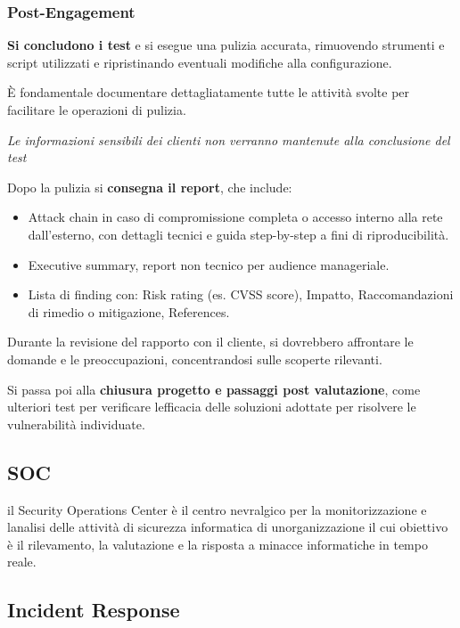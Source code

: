 \subsubsection{Post-Engagement}\label{post-engagement}

\textbf{Si concludono i test} e si esegue una pulizia accurata,
rimuovendo strumenti e script utilizzati e ripristinando eventuali
modifiche alla configurazione.

È fondamentale documentare dettagliatamente tutte le attività svolte per
facilitare le operazioni di pulizia.

\emph{Le informazioni sensibili dei clienti non verranno mantenute alla
conclusione del test}

Dopo la pulizia si \textbf{consegna il report}, che include:

\begin{itemize}
\item
  Attack chain in caso di compromissione completa o accesso interno alla
  rete dall'esterno, con dettagli tecnici e guida step-by-step a fini di
  riproducibilità.
\item
  Executive summary, report non tecnico per audience manageriale.
\item
  Lista di finding con: Risk rating (es. CVSS score), Impatto,
  Raccomandazioni di rimedio o mitigazione, References.
\end{itemize}

Durante la revisione del rapporto con il cliente, si dovrebbero
affrontare le domande e le preoccupazioni, concentrandosi sulle scoperte
rilevanti.

Si passa poi alla \textbf{chiusura progetto e passaggi post
valutazione}, come ulteriori test per verificare
l\textquotesingle efficacia delle soluzioni adottate per risolvere le
vulnerabilità individuate.

\subsection{SOC}\label{soc}

il Security Operations Center è il centro nevralgico per la
monitorizzazione e l\textquotesingle analisi delle attività di sicurezza
informatica di un\textquotesingle organizzazione il cui obiettivo è il
rilevamento, la valutazione e la risposta a minacce informatiche in
tempo reale.

\subsection{Incident Response}\label{incident-response}

